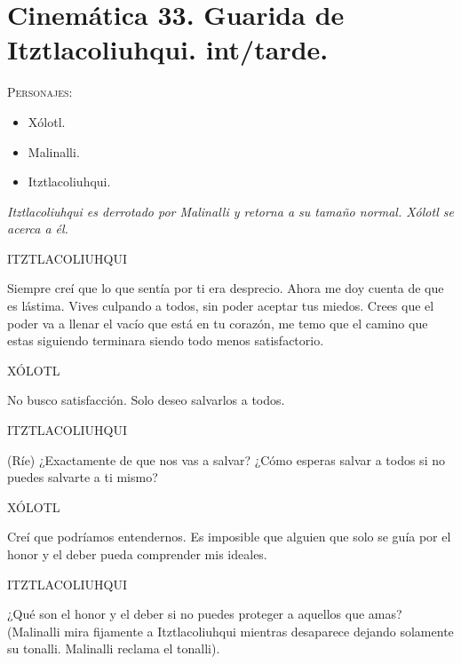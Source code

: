 \documentclass[11pt,letterpaper]{article}
\begin{document}
\section{Cinemática 33. Guarida de Itztlacoliuhqui. int/tarde.}
 \textsc{Personajes}:
 \begin{itemize}
 \item Xólotl.
 \item Malinalli.
 \item Itztlacoliuhqui.
 \end{itemize}
\textit{Itztlacoliuhqui es derrotado por Malinalli y retorna a su tamaño normal. Xólotl se acerca a él.}
\begin{center}
ITZTLACOLIUHQUI
\\
\par
Siempre creí que lo que sentía por ti era desprecio. Ahora me doy cuenta de que es lástima. Vives culpando a todos, sin poder aceptar tus miedos. Crees que el poder va a llenar el vacío que está en tu corazón, me temo que el camino que estas siguiendo terminara siendo todo menos satisfactorio.
\\
\par
XÓLOTL
\\
\par
No busco satisfacción. Solo deseo salvarlos a todos.
\\
\par
ITZTLACOLIUHQUI
\\
\par
(Ríe) ¿Exactamente de que nos vas a salvar? ¿Cómo esperas salvar a todos si no puedes salvarte a ti mismo?
\\
\par
XÓLOTL
\\
\par
Creí que podríamos entendernos. Es imposible que alguien que solo se guía por el honor y el deber pueda comprender mis ideales.
\\
\par
ITZTLACOLIUHQUI
\\
\par
¿Qué son el honor y el deber si no puedes proteger a aquellos que amas? (Malinalli mira fijamente a Itztlacoliuhqui mientras desaparece dejando solamente su tonalli. Malinalli reclama el tonalli).
\end{center}
\end{document}
